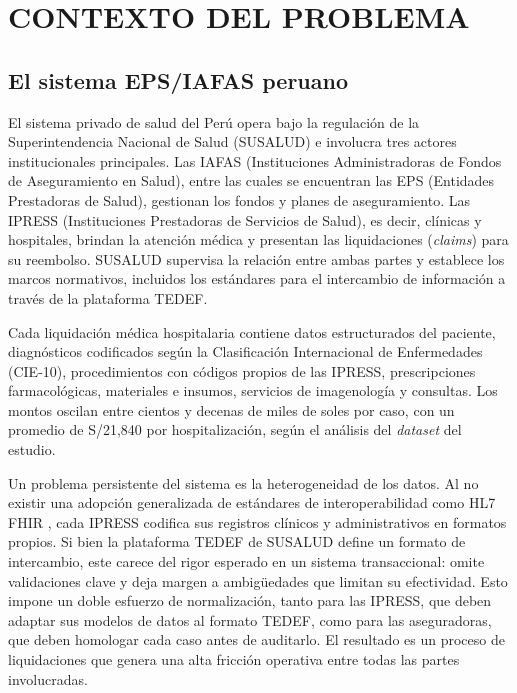 
\chapter{CONTEXTO DEL PROBLEMA}

\section{El sistema EPS/IAFAS peruano}
El sistema privado de salud del Perú opera bajo la regulación de la Superintendencia Nacional de Salud (SUSALUD) e involucra tres actores institucionales principales. Las IAFAS (Instituciones Administradoras de Fondos de Aseguramiento en Salud), entre las cuales se encuentran las EPS (Entidades Prestadoras de Salud), gestionan los fondos y planes de aseguramiento. Las IPRESS (Instituciones Prestadoras de Servicios de Salud), es decir, clínicas y hospitales, brindan la atención médica y presentan las liquidaciones (\textit{claims}) para su reembolso. SUSALUD supervisa la relación entre ambas partes y establece los marcos normativos, incluidos los estándares para el intercambio de información a través de la plataforma TEDEF.

Cada liquidación médica hospitalaria contiene datos estructurados del paciente, diagnósticos codificados según la Clasificación Internacional de Enfermedades (CIE-10), procedimientos con códigos propios de las IPRESS, prescripciones farmacológicas, materiales e insumos, servicios de imagenología y consultas. Los montos oscilan entre cientos y decenas de miles de soles por caso, con un promedio de S/21,840 por hospitalización, según el análisis del \textit{dataset} del estudio.

Un problema persistente del sistema es la heterogeneidad de los datos. Al no existir una adopción generalizada de estándares de interoperabilidad como HL7 FHIR \cite{hl7_2019_fhir}, cada IPRESS codifica sus registros clínicos y administrativos en formatos propios. Si bien la plataforma TEDEF de SUSALUD define un formato de intercambio, este carece del rigor esperado en un sistema transaccional: omite validaciones clave y deja margen a ambigüedades que limitan su efectividad. Esto impone un doble esfuerzo de normalización, tanto para las IPRESS, que deben adaptar sus modelos de datos al formato TEDEF, como para las aseguradoras, que deben homologar cada caso antes de auditarlo. El resultado es un proceso de liquidaciones que genera una alta fricción operativa entre todas las partes involucradas.

